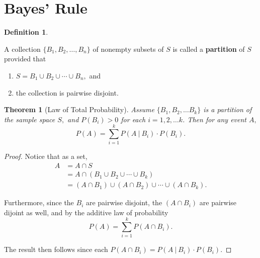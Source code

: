 \documentclass[
]{book}
\providecommand{\tightlist}{%
  \setlength{\itemsep}{0pt}\setlength{\parskip}{0pt}}
\newtheorem{theorem}{Theorem}[chapter]
\theoremstyle{definition}
\newtheorem{definition}{Definition}[chapter]
\theoremstyle{definition}
\theoremstyle{definition}
\theoremstyle{definition}
\theoremstyle{remark}
\begin{document}
\section{Bayes' Rule}\label{bayes-rule}

\begin{definition}
\protect\hypertarget{def:partition}{}\label{def:partition}

A collection \(\{B_1, B_2, \ldots, B_n\}\) of nonempty subsets of \(S\) is called a \textbf{partition} of \(S\) provided that

\begin{enumerate}
\def\labelenumi{\arabic{enumi}.}
\tightlist
\item
  \(S = B_1 \cup B_2 \cup \cdots \cup B_n,\) and
\item
  the collection is pairwise disjoint.
\end{enumerate}

\end{definition}

\begin{theorem}[Law of Total Probability]
\protect\hypertarget{thm:total-law-prob}{}\label{thm:total-law-prob}Assume \(\{B_1, B_2, \ldots B_k\}\) is a partition of the sample space \(S,\) and \(P(B_i) > 0\) for each \(i = 1, 2, \ldots k\). Then for any event \(A,\) \[P(A) = \sum_{i=1}^k P(A~|~B_i)\cdot P(B_i).\]
\end{theorem}

\begin{proof}
Notice that as a set,
\begin{align*}
A &= A \cap S \\
  &= A \cap (B_1 \cup B_2 \cup \cdots \cup B_k) \\
  &= (A \cap B_1) \cup (A \cap B_2) \cup \cdots \cup (A \cap B_k).
\end{align*}

Furthermore, since the \(B_i\) are pairwise disjoint, the \((A \cap B_i)\) are pairwise dijoint as well, and by the additive law of probability \[P(A) = \sum_{i = 1}^k P(A \cap B_i).\]

The result then follows since each \(P(A \cap B_i) = P(A~|~B_i)\cdot P(B_i)\).
\end{proof}
\end{document}
